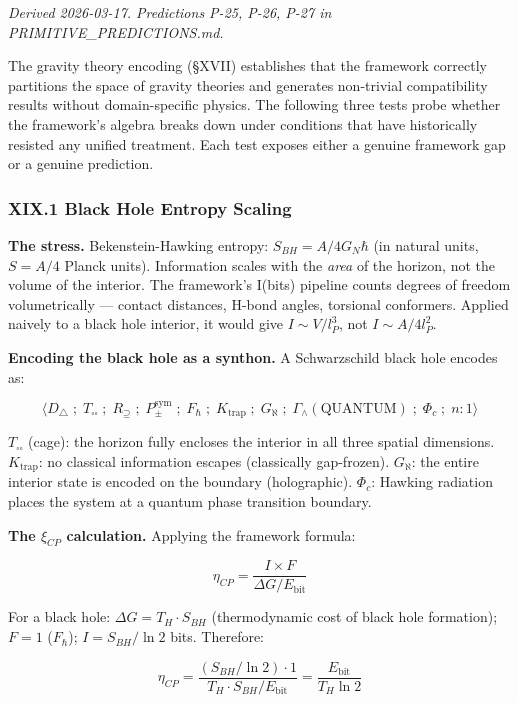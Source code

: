 \documentclass[12pt,a4paper]{article}
\begin{document}
\emph{Derived 2026-03-17. Predictions P-25, P-26, P-27 in PRIMITIVE\_PREDICTIONS.md.}

The gravity theory encoding (§XVII) establishes that the framework correctly partitions the space of gravity theories and generates non-trivial compatibility results without domain-specific physics. The following three tests probe whether the framework's algebra breaks down under conditions that have historically resisted any unified treatment. Each test exposes either a genuine framework gap or a genuine prediction.

\subsubsection{XIX.1 Black Hole Entropy Scaling}

\textbf{The stress.} Bekenstein-Hawking entropy: $S_{BH} = A / 4G_N\hbar$ (in natural units, $S = A/4$ Planck units). Information scales with the \emph{area} of the horizon, not the volume of the interior. The framework's I(bits) pipeline counts degrees of freedom volumetrically --- contact distances, H-bond angles, torsional conformers. Applied naively to a black hole interior, it would give $I \sim V/l_P^3$, not $I \sim A/4l_P^2$.

\textbf{Encoding the black hole as a synthon.} A Schwarzschild black hole encodes as:

\[\langle D_{\triangle} \;;\; T_{\square\square} \;;\; R_{\supseteq} \;;\; P_{\pm}^{\text{sym}} \;;\; F_{\hbar} \;;\; K_{\text{trap}} \;;\; G_{\aleph} \;;\; \Gamma_{\wedge}(\text{QUANTUM}) \;;\; \Phi_{c} \;;\; n{:}1 \rangle\]

$T_{\square\square}$ (cage): the horizon fully encloses the interior in all three spatial dimensions. $K_{\text{trap}}$: no classical information escapes (classically gap-frozen). $G_{\aleph}$: the entire interior state is encoded on the boundary (holographic). $\Phi_c$: Hawking radiation places the system at a quantum phase transition boundary.

\textbf{The $\xi_{CP}$ calculation.} Applying the framework formula:

\[\eta_{CP} = \frac{I \times F}{\Delta G / E_{\text{bit}}}\]

For a black hole: $\Delta G = T_H \cdot S_{BH}$ (thermodynamic cost of black hole formation); $F = 1$ ($F_{\hbar}$); $I = S_{BH}/\ln 2$ bits. Therefore:

\[\eta_{CP} = \frac{(S_{BH}/\ln 2) \cdot 1}{T_H \cdot S_{BH} / E_{\text{bit}}} = \frac{E_{\text{bit}}}{T_H \ln 2}\]
\end{document}
